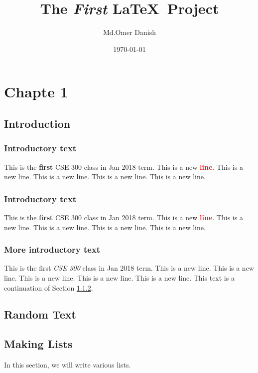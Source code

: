 \documentclass{book}
\title{The \textit{First} \LaTeX ~\textbf{Project}}
\author{Md.Omer  Danish}
\date{\today}
\begin{document}
\maketitle

\newpage

\tableofcontents

\newpage

\chapter{Chapte 1}

\section{Introduction}

\subsection{Introductory text}
This is the \textbf{first} CSE 300 class in Jan 2018 term.
This is a new \textcolor{red}{\textbf{line}}.
This is a new line.
This is a new line.
This is a new line.
This is a new line.


\subsection{Introductory text}
\label{sec:intro_text}
This is the \textbf{first} CSE 300 class in Jan 2018 term.
This is a new \textcolor{red}{\textbf{line}}.
This is a new line.
This is a new line.
This is a new line.
This is a new line.

\subsection{More introductory text}
This is the first \textit{CSE 300} class in Jan 2018 term.
This is a new line.
This is a new line.
This is a new line.
This is a new line.
This is a new line. This text is a continuation of Section \ref{sec:intro_text}.

\section{Random Text}

\lipsum

\section{Making Lists}
In this section, we will write various lists.
\end{document}
